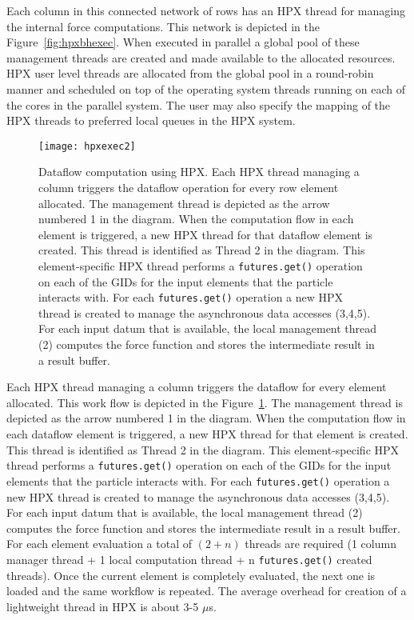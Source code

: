 \documentclass[floatfix]{revtex4}
\begin{document}
Each column in this connected network of rows has an HPX thread for managing the internal
force computations. This network is depicted in the Figure~\ref{fig:hpxbhexec}. When executed in parallel
a global pool of these management threads are created and made available to the allocated resources. 
HPX user level threads are allocated from the global pool in a round-robin
manner and scheduled on top of the operating system threads running on
each of the cores in the parallel system.
The user may also specify the mapping of the HPX threads to preferred local queues in the HPX system.

\begin{figure}[htp]
\centering
\texttt{[image: hpxexec2]}
\caption{Dataflow computation using HPX. Each HPX thread managing a column triggers the dataflow operation for
every row element allocated. The management thread is
depicted as the arrow numbered 1 in the diagram. When the
computation flow in each element is triggered, a new
HPX thread for that dataflow element is created. This thread is identified
as Thread 2 in the diagram. This element-specific HPX thread
performs a {\tt futures.get()} operation
on each of the GIDs for the input elements that the particle
interacts with. For each {\tt futures.get()} operation a new
HPX thread is created to manage the asynchronous data accesses (3,4,5).
For each input datum that is available, the local
management thread (2) computes the force function and stores the intermediate
result in a result buffer.}
\label{fig:hpxbhexec2}
\end{figure}

Each HPX thread managing a column triggers the dataflow for
every element allocated. This work flow is depicted
in the Figure~\ref{fig:hpxbhexec2}. The management thread is
depicted as the arrow numbered 1 in the diagram. When the
computation flow in each dataflow element is triggered, a new
HPX thread for that element is created. This thread is identified
as Thread 2 in the diagram. This element-specific HPX thread
performs a {\tt futures.get()} operation
on each of the GIDs for the input elements that the particle
interacts with. For each {\tt futures.get()} operation a new
HPX thread is created to manage the asynchronous data accesses (3,4,5).
For each input datum that is available, the local
management thread (2) computes the force function and stores the intermediate
result in a result buffer. For each element evaluation a total of $(2 + n)$ threads
are required (1 column manager thread + 1 local computation thread + n {\tt futures.get()}
created threads). Once the current element is completely evaluated, the next 
one is loaded and the same workflow is repeated.
The average overhead for creation of a lightweight thread in HPX is about 3-5 $\mu$s.
\end{document}
